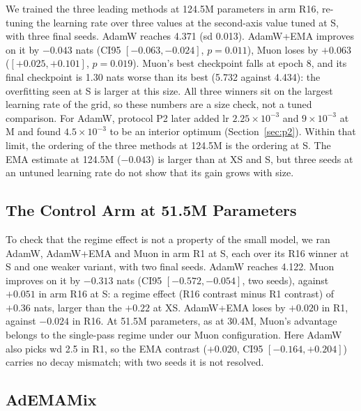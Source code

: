 \documentclass[twoside,11pt]{article}
\begin{document}
We trained the three leading methods at 124.5M parameters in arm R16, re-tuning the learning rate over three values at the second-axis value tuned at S, with three final seeds. AdamW reaches 4.371 (sd 0.013). AdamW+EMA improves on it by $-0.043$ nats (CI95 $[-0.063, -0.024]$, $p = 0.011$), Muon loses by $+0.063$ ($[+0.025, +0.101]$, $p = 0.019$). Muon's best checkpoint falls at epoch 8, and its final checkpoint is 1.30 nats worse than its best (5.732 against 4.434): the overfitting seen at S is larger at this size. All three winners sit on the largest learning rate of the grid, so these numbers are a size check, not a tuned comparison. For AdamW, protocol P2 later added lr $2.25\times10^{-3}$ and $9\times10^{-3}$ at M and found $4.5\times10^{-3}$ to be an interior optimum (Section~\ref{sec:p2}). Within that limit, the ordering of the three methods at 124.5M is the ordering at S. The EMA estimate at 124.5M ($-0.043$) is larger than at XS and S, but three seeds at an untuned learning rate do not show that its gain grows with size.

\subsection{The Control Arm at 51.5M Parameters}
\label{sec:r1s}

To check that the regime effect is not a property of the small model, we ran AdamW, AdamW+EMA and Muon in arm R1 at S, each over its R16 winner at S and one weaker variant, with two final seeds. AdamW reaches 4.122. Muon improves on it by $-0.313$ nats (CI95 $[-0.572, -0.054]$, two seeds), against $+0.051$ in arm R16 at S: a regime effect (R16 contrast minus R1 contrast) of $+0.36$ nats, larger than the $+0.22$ at XS. AdamW+EMA loses by $+0.020$ in R1, against $-0.024$ in R16. At 51.5M parameters, as at 30.4M, Muon's advantage belongs to the single-pass regime under our Muon configuration. Here AdamW also picks wd 2.5 in R1, so the EMA contrast ($+0.020$, CI95 $[-0.164, +0.204]$) carries no decay mismatch; with two seeds it is not resolved.

\subsection{AdEMAMix}
\label{sec:ademamix}
\end{document}
